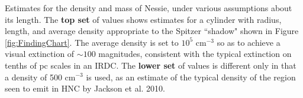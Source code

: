 \label{fig:table1} Estimates for the density and mass of Nessie, under various assumptions about its length.  The {\bf top set} of values shows estimates for a cylinder with radius, length, and average density appropriate to the Spitzer ``shadow" shown in Figure \ref{fig:FindingChart}.  The average density is set to $10^5$ cm$^{-3}$ so as to achieve a visual extinction of $\sim 100$ magnitudes, consistent with the typical extinction on tenths of pc scales in an IRDC.  The {\bf lower set} of values is different only in that a density of 500 cm$^{-3}$ is used, as an estimate of the typical density of the region seen to emit in HNC by Jackson et al. 2010.